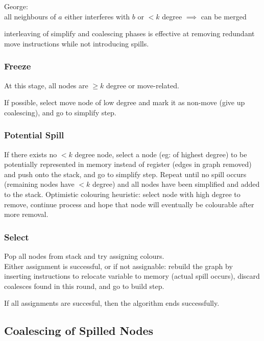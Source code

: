 \documentclass[8pt]{extarticle}
\begin{document}
\begin{multicols*}{2}
  George:\\
  all neighbours of $a$ either interferes with $b$ or $<k$ degree $\implies$ can be merged

  interleaving of simplify and coalescing phases is effective at removing redundant move instructions while not introducing spills.

  \subsubsection{Freeze}
  At this stage, all nodes are $\geq k$ degree or move-related.
  
  If possible, select move node of low degree and mark it as non-move (give up coalescing), and go to simplify step.

  \subsubsection{Potential Spill}
  If there exists no $<k$ degree node, select a node (eg: of highest degree) to be potentially represented in memory instead of register (edges in graph removed) and push onto the stack, and go to simplify step. Repeat until no spill occurs (remaining nodes have $< k$ degree) and all nodes have been simplified and added to the stack. Optimistic colouring heuristic: select node with high degree to remove, continue process and hope that node will eventually be colourable after more removal.

  \subsubsection{Select}
  Pop all nodes from stack and try assigning colours.\\
  Either assignment is successful, or if not assignable: rebuild the graph by inserting instructions to relocate variable to memory (actual spill occurs), discard coalesces found in this round, and go to build step.

  If all assignments are succesful, then the algorithm ends successfully.

  \subsection{Coalescing of Spilled Nodes}


\end{multicols*}
\end{document}
